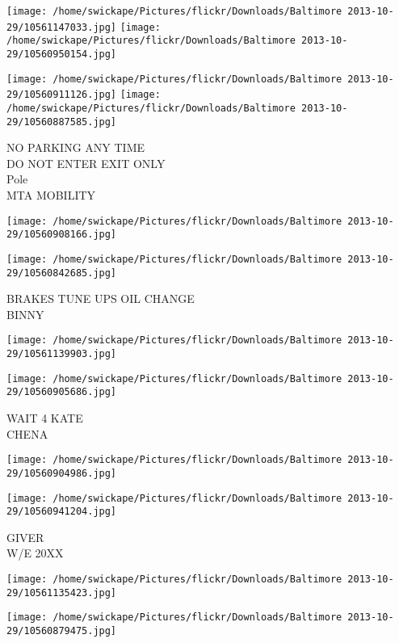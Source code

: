 \documentclass[10pt,letterpaper]{article}
\begin{document}
\texttt{[image: /home/swickape/Pictures/flickr/Downloads/Baltimore 2013-10-29/10561147033.jpg]}
\texttt{[image: /home/swickape/Pictures/flickr/Downloads/Baltimore 2013-10-29/10560950154.jpg]}

\texttt{[image: /home/swickape/Pictures/flickr/Downloads/Baltimore 2013-10-29/10560911126.jpg]}
\texttt{[image: /home/swickape/Pictures/flickr/Downloads/Baltimore 2013-10-29/10560887585.jpg]}

NO PARKING ANY TIME\\
DO NOT ENTER EXIT ONLY\\
Pole\\
MTA MOBILITY\\
\pagebreak

\texttt{[image: /home/swickape/Pictures/flickr/Downloads/Baltimore 2013-10-29/10560908166.jpg]}

\vspace{0.25in}
\texttt{[image: /home/swickape/Pictures/flickr/Downloads/Baltimore 2013-10-29/10560842685.jpg]}

BRAKES TUNE UPS OIL CHANGE\\
BINNY\\
\pagebreak

\texttt{[image: /home/swickape/Pictures/flickr/Downloads/Baltimore 2013-10-29/10561139903.jpg]}

\vspace{0.25in}
\texttt{[image: /home/swickape/Pictures/flickr/Downloads/Baltimore 2013-10-29/10560905686.jpg]}

WAIT 4 KATE\\
CHENA\\
\pagebreak

\texttt{[image: /home/swickape/Pictures/flickr/Downloads/Baltimore 2013-10-29/10560904986.jpg]}

\vspace{0.25in}
\texttt{[image: /home/swickape/Pictures/flickr/Downloads/Baltimore 2013-10-29/10560941204.jpg]}

GIVER\\
W/E 20XX\\
\pagebreak

\texttt{[image: /home/swickape/Pictures/flickr/Downloads/Baltimore 2013-10-29/10561135423.jpg]}

\vspace{0.25in}
\texttt{[image: /home/swickape/Pictures/flickr/Downloads/Baltimore 2013-10-29/10560879475.jpg]}
\end{document}
